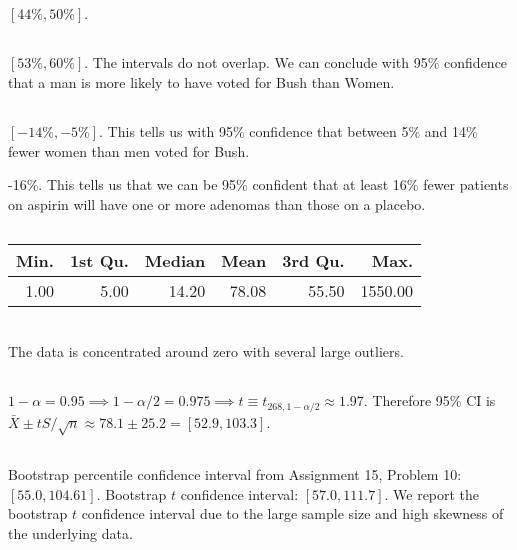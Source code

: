\documentclass[twocolumn]{article}
\begin{document}
\subsection{}$[44\%,50\%]$.
\subsection{}$[53\%,60\%]$. The intervals do not overlap. We can conclude with 95\% confidence that a man is more likely to have voted for Bush than Women. 
\subsection{}$[-14\%,-5\%]$. This tells us with 95\% confidence that between 5\% and 14\% fewer women than men voted for Bush.

-16\%. This tells us that we can be 95\% confident that at least 16\% fewer patients on aspirin will have one or more adenomas than those on a placebo.

\subsection{}
\begin{table}[h]
\begin{tabular}{@{}rrrrrr@{}}
\toprule
Min. & 1st Qu. & Median & Mean  & 3rd Qu. & Max.    \\ \midrule
1.00 & 5.00    & 14.20  & 78.08 & 55.50   & 1550.00 \\ \bottomrule
\end{tabular}
\end{table}
\\
The data is concentrated around zero with several large outliers.
\subsection{}
$1-\alpha=0.95\implies 1-\alpha/2=0.975\implies t\equiv t_{268,1-\alpha/2}\approx 1.97$. Therefore 95\% CI is $\bar X\pm tS/\sqrt{n}\approx 78.1\pm25.2=[52.9,103.3]$.
\subsection{}
Bootstrap percentile confidence interval from Assignment 15, Problem 10: $[55.0,104.61]$. Bootstrap $t$ confidence interval: $[57.0,111.7]$. We report the bootstrap $t$ confidence interval due to the large sample size and high skewness of the underlying data.
\end{document}
